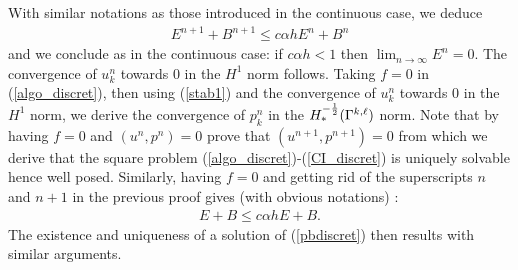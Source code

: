 \documentclass[final]{siamltex}
\begin{document}
With similar notations as those introduced in the
continuous case, we deduce
\begin{eqnarray}
E^{n+1} + B^{n+1} \le c \alpha h E^n + B^n \nonumber
\end{eqnarray}
and we conclude as in the continuous case: if $c \alpha h < 1$ then
$\lim_{n\rightarrow\infty}E^n = 0$. The convergence of $u_k^n$ towards
0 in the $H^1$ norm follows. Taking $f=0$ in (\ref{algo_discret}), then using (\ref{stab1})
and the convergence of $u_k^n$ towards 0 in the $H^1$ norm, we derive the convergence of $p_k^n$ in the
$H^{-{1\over 2}}_*(\Gamma^{k,\ell})$ norm.
Note that by having $f=0$ and $(u^n,p^n)=0$ prove that
$(u^{n+1},p^{n+1})=0$ from which we derive that the square problem
(\ref{algo_discret})-(\ref{CI_discret}) is uniquely solvable hence well posed.
Similarly, having $f=0$ and getting rid of the superscripts $n$ and $n+1$
in the previous proof gives (with obvious notations) :
\begin{eqnarray}
E + B \le c \alpha h E + B.\nonumber
\end{eqnarray}
The existence and uniqueness of a solution of (\ref{pbdiscret}) then results with similar arguments.
\end{document}
